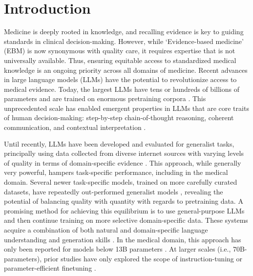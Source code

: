 \documentclass{article}
\renewcommand{\thefootnote}{\fnsymbol{footnote}}
\begin{document}
\renewcommand{\thefootnote}{\arabic{footnote}}

\section{Introduction} \label{sec:introduction}
Medicine is deeply rooted in knowledge, and recalling evidence is key to guiding standards in clinical decision-making. However, while `Evidence-based medicine' (EBM) is now synonymous with quality care, it requires expertise that is not universally available.
Thus, ensuring equitable access to standardized medical knowledge is an ongoing priority across all domains of medicine.
Recent advances in large language models (LLMs) \citep{gpt-3, llama, falcon40b, llama2, openai2023gpt4, chowdhery2022palm} have the potential to revolutionize access to medical evidence.
Today, the largest LLMs have tens or hundreds of billions of parameters \citep{Bommasani2021OnTO, hoffmann2022training, kaplan2020scaling} and are trained on enormous pretraining corpora \citep{Raffel2019ExploringTL, Gao2020ThePA, together2023redpajama, DolmaDataset}. This unprecedented scale has  
enabled emergent properties in LLMs that are core traits of human decision-making: step-by-step chain-of-thought reasoning, coherent communication, and contextual interpretation  \citep{bubeck2023sparks, wei2023chainofthought, wang2023selfconsistency}.


Until recently, LLMs have been developed and evaluated for generalist tasks, principally using data collected from diverse internet sources with varying levels of quality in terms of domain-specific evidence \citep{codellama}. This approach, while generally very powerful, hampers task-specific performance, including in the medical domain. Several newer task-specific models, trained on more carefully curated datasets, have repeatedly out-performed generalist models \citep{wu2023bloomberggpt, yue2023fedjudge, codellama, azerbayev2023llemma}, revealing the potential of balancing quality with quantity with regards to pretraining data.
A promising method for achieving this equilibrium is to use general-purpose LLMs and then continue training on more selective domain-specific data. These systems acquire a combination of both natural and domain-specific language understanding and generation skills \citep{gururangan-etal-2020-dont}. In the medical domain, this approach has only been reported for models below 13B parameters \citep{biobert, pubmedbert, gatortrongpt, wu2023pmcllama}. At larger scales (i.e.,  70B-parameters), prior studies have only explored the scope of instruction-tuning \citep{med42} or parameter-efficient finetuning \citep{toma2023clinical}.
\end{document}
